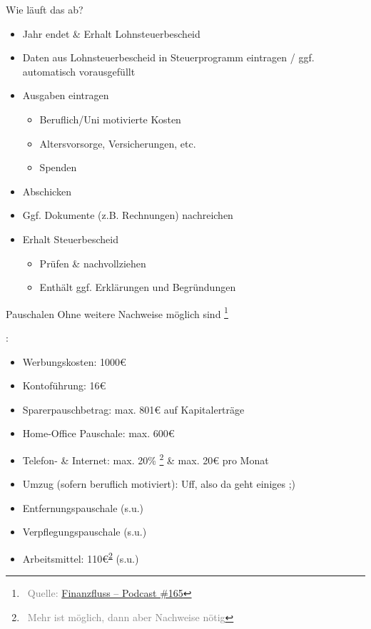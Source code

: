 \documentclass[draft]{beamer}
\let\oldfootnote\footnote
\renewcommand{\footnote}[1]
{%
	\oldfootnote
	{
		\tiny
		\textcolor{gray}{\ #1}
	}%
}
\renewcommand{\footref}[1]{\textsuperscript{\ref{#1}}}
\newcommand{\citeurl}[2]
{%
	\footnote{Quelle: \href{#1}{#2}}
}
\begin{document}
			\begin{frame}{Wie läuft das ab?}
				\begin{itemize}
					\item Jahr endet \& Erhalt Lohnsteuerbescheid
					\item Daten aus Lohnsteuerbescheid in Steuerprogramm eintragen / ggf. automatisch vorausgefüllt
					\item Ausgaben eintragen
					\begin{itemize}
						\item Beruflich/Uni motivierte Kosten
						\item Altersvorsorge, Versicherungen, etc.
						\item Spenden
					\end{itemize}
					\item Abschicken
					\item Ggf. Dokumente (z.B. Rechnungen) nachreichen
					\item Erhalt Steuerbescheid
					\begin{itemize}
						\item Prüfen \& nachvollziehen
						\item Enthält ggf. Erklärungen und Begründungen
					\end{itemize}
				\end{itemize}
			\end{frame}
		
			\begin{frame}{Pauschalen}
				Ohne weitere Nachweise möglich sind\citeurl{https://www.finanzfluss.de/podcast/folge-165/}{Finanzfluss -- Podcast \#165}:
				\begin{itemize}
					\item Werbungskosten: 1000€
					\item Kontoführung: 16€
					\item Sparerpauschbetrag: max. 801€ auf Kapitalerträge
					\item Home-Office Pauschale: max. 600€
					\item Telefon- \& Internet: max. 20\%\footnote{\label{mehr-moeglich}Mehr ist möglich, dann aber Nachweise nötig} \& max. 20€ pro Monat
					\item Umzug (sofern beruflich motiviert): Uff, also da geht einiges ;)
					\item Entfernungspauschale (s.u.)
					\item Verpflegungspauschale (s.u.)
					\item Arbeitsmittel: 110€\footref{mehr-moeglich} (s.u.)
				\end{itemize}
			\end{frame}
		
\end{document}
